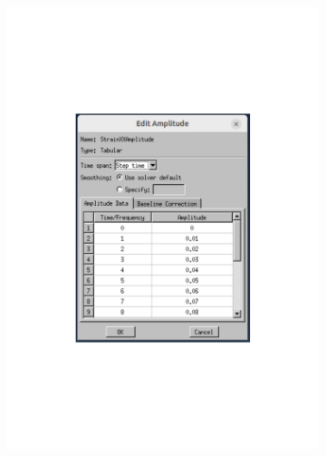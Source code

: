 \begin{figure}[H]
    \centering
    \begin{subfigure}[t]{0.35\textwidth}
        \centering
        \includegraphics[width=\linewidth]{Amplitude.pdf}
        \vfill{}
        \caption{} %
        \label{fig:amplitudemenu}
    \end{subfigure}
    \hspace{0.08\textwidth}
    \begin{subfigure}[t]{0.35\textwidth}
        \centering

\end{subfigure}
\end{figure}
